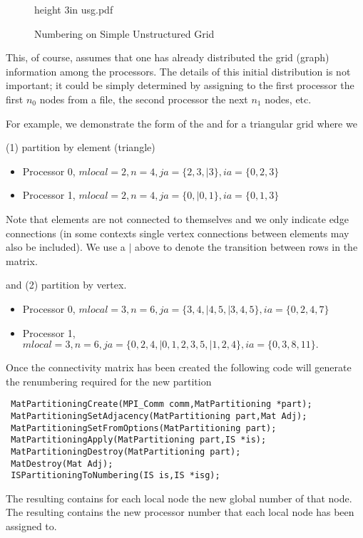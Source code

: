 \begin{figure}[H]
\centerline{\immediate \pdfximage height 3in {usg.pdf} \pdfrefximage \pdflastximage}
\caption{Numbering on Simple Unstructured Grid}
\label{fig:usg}
\end{figure}

This, of course, assumes that one has already distributed the grid (graph) information
among the processors. The details of this initial distribution is not important; it 
could be simply determined by assigning to the first processor the first $n_0$ nodes
from a file, the second processor the next $ n_1$ nodes, etc.

For example, we demonstrate the form of the  and  for a triangular
grid where we 

(1) partition by element (triangle) 
\begin{itemize}
  \item Processor 0, $ mlocal = 2, n = 4, ja = \{2, 3,| 3\}, ia = \{0, 2, 3\} $
  \item Processor 1, $ mlocal = 2, n = 4, ja = \{0, | 0, 1\}, ia = \{0, 1, 3\} $
\end{itemize}
Note that elements are not connected to themselves and we only indicate edge connections
(in some contexts single vertex connections between elements may also be included). We use a
$ | $ above to denote the transition between rows in the matrix.

and (2) partition by vertex.
\begin{itemize}
  \item Processor 0, $ mlocal = 3, n = 6, ja = \{3, 4, | 4, 5, | 3, 4, 5\}, ia = \{0, 2, 4, 7\} $
  \item Processor 1, $ mlocal = 3, n = 6, ja = \{0, 2, 4, |  0, 1, 2, 3, 5,|  1, 2, 4\}, ia = \{0, 3, 8, 11\}. $
\end{itemize}



Once the connectivity matrix has been created the following code will generate the 
renumbering required for the new partition
\begin{verbatim}
 MatPartitioningCreate(MPI_Comm comm,MatPartitioning *part);
 MatPartitioningSetAdjacency(MatPartitioning part,Mat Adj);
 MatPartitioningSetFromOptions(MatPartitioning part);
 MatPartitioningApply(MatPartitioning part,IS *is);
 MatPartitioningDestroy(MatPartitioning part); 
 MatDestroy(Mat Adj);
 ISPartitioningToNumbering(IS is,IS *isg);
\end{verbatim}
The   
  
  resulting  contains for each local node the new global
number of that node. The resulting  contains the new processor number
that each local node has been assigned to.

